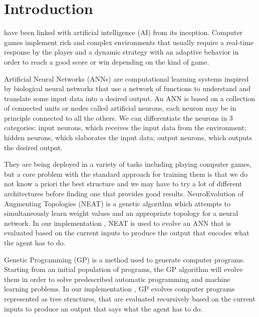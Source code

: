 \section{Introduction}
 have been linked with artificial intelligence (AI) from its inception.
Computer games implement rich and complex environments that usually require a real-time
response by the player and a dynamic strategy with an adaptive behavior in order to reach a
good score or win depending on the kind of game.


Artificial Neural Networks (ANNs) are computational learning systems inspired by biological
neural networks that use a network of functions to understand and translate some input data
into a desired output. An ANN is based on a collection of connected units or nodes called
artificial neurons, each neuron may be in principle connected to all the others. We can
differentiate the neurons in 3 categories: input neurons, which receives the input data from 
the environment; hidden neurons, which elaborates the input data; output neurons, which outputs the desired output.

They are being deployed in a variety of tasks including playing computer games, but a core
problem with the standard approach for training them is that we do not know a priori the best
structure and we may have to try a lot of different architectures before finding one that
provides good results. NeuroEvolution of Augmenting Topologies (NEAT) \cite{NEAT} is a genetic
algorithm which attempts to simultaneously learn weight values and an appropriate topology
for a neural network. In our implementation \cite{repository}, NEAT is used to evolve an ANN that is
evaluated based on the current inputs to produce the output that encodes what the agent has to do.

Genetic Programming (GP) \cite{GP} is a method used to generate computer programs. Starting
from an initial population of programs, the GP algorithm will evolve them in order to solve
predescribed automatic programming and machine learning problems. In our implementation
\cite{repository}, GP evolves computer programs represented as tree structures, that are evaluated
recursively based on the current inputs to produce an output that says what the agent has to do.
